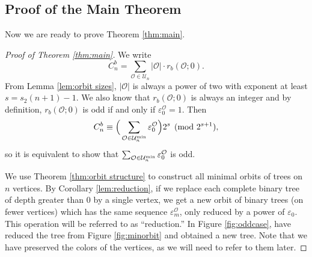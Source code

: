 \subsection{Proof of the Main Theorem}\label{subsec:proof}

Now we are ready to prove Theorem \ref{thm:main}.

\begin{proof}[Proof of Theorem \ref{thm:main}]
    We write
    \[C^b_n=\sum_{\mathcal{O}\in\mathcal{U}_n}\lvert \mathcal{O}\rvert\cdot r_b(\mathcal{O}; 0).\]
    From Lemma \ref{lem:orbit sizes}, $\lvert \mathcal{O}\rvert$ is always a power of two with exponent at least $s=s_2(n+1)-1$. We also know that $r_b(\mathcal{O}; 0)$ is always an integer and by definition, $r_b(\mathcal{O}; 0)$ is odd if and only if $\varepsilon^{\mathcal{O}}_0=1$. Then
    \[C^b_n\equiv \Big(\sum_{\mathcal{O}\in\mathcal{U}_n^{\text{min}}}\varepsilon^{\mathcal{O}}_0\Big)2^s\pmod{2^{s+1}},\]
    so it is equivalent to show that $\sum_{\mathcal{O}\in\mathcal{U}_n^{\text{min}}}\varepsilon^{\mathcal{O}}_0$ is odd.

    We use Theorem \ref{thm:orbit structure} to construct all minimal orbits of trees on $n$ vertices. By Corollary \ref{lem:reduction}, if we replace each complete binary tree of depth greater than $0$ by a single vertex, we get a new orbit of binary trees (on fewer vertices) which has the same sequence $\varepsilon^{\mathcal{O}}_m$, only reduced by a power of $\varepsilon_0$. This operation will be referred to as ``reduction.'' In Figure \ref{fig:oddcase}, have reduced the tree from Figure \ref{fig:minorbit} and obtained a new tree. Note that we have preserved the colors of the vertices, as we will need to refer to them later.
    

\end{proof}

